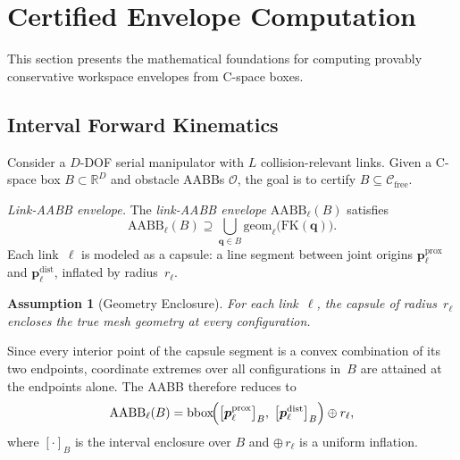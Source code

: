 \documentclass[journal]{IEEEtran}
\newtheorem{assumption}{Assumption}
\newcommand{\Cfree}{\mathcal{C}_\text{free}}
\newcommand{\AABB}{\text{AABB}}
\newcommand{\FK}{\text{FK}}
\newcommand{\Real}{\mathbb{R}}
\newcommand{\calO}{\mathcal{O}}
\begin{document}
\section{Certified Envelope Computation}\label{sec:envelope}


This section presents the mathematical foundations for computing
provably conservative workspace envelopes from C-space boxes.

\subsection{Interval Forward Kinematics}\label{sec:ifk}

Consider a $D$-DOF serial manipulator with $L$ collision-relevant links.
Given a C-space box $B \subset \Real^D$ and obstacle AABBs $\calO$,
the goal is to certify $B \subseteq \Cfree$.

\emph{Link-AABB envelope.}
The \emph{link-AABB envelope} $\AABB_\ell(B)$ satisfies
\begin{equation}\label{eq:envelope}
  \AABB_\ell(B) \supseteq \bigcup_{\bm{q} \in B}
    \mathrm{geom}_\ell\bigl(\FK(\bm{q})\bigr).
\end{equation}
Each link~$\ell$ is modeled as a capsule: a line segment between joint
origins $\bm{p}_\ell^{\mathrm{prox}}$ and $\bm{p}_\ell^{\mathrm{dist}}$,
inflated by radius~$r_\ell$.

\begin{assumption}[Geometry Enclosure]\label{asm:geom}
For each link~$\ell$, the capsule of radius~$r_\ell$ encloses the
true mesh geometry at every configuration.
\end{assumption}

Since every interior point of the capsule segment is a convex combination
of its two endpoints, coordinate extremes over all configurations in~$B$
are attained at the endpoints alone.
The AABB therefore reduces to
\begin{equation}\label{eq:endpoint_aabb}
  \AABB_\ell(B)
  = \mathrm{bbox}\!\Bigl(
      \bigl[\bm{p}_\ell^{\mathrm{prox}}\bigr]_B,\;
      \bigl[\bm{p}_\ell^{\mathrm{dist}}\bigr]_B
    \Bigr) \oplus r_\ell,
\end{equation}
where $[\cdot]_B$ is the interval enclosure over $B$ and $\oplus\,r_\ell$
is a uniform inflation.
\end{document}
